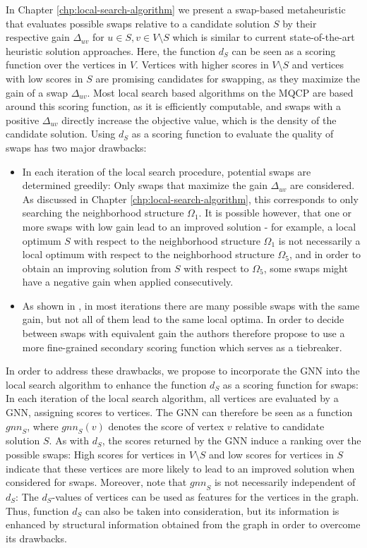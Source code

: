 \documentclass[draft,final]{vutinfth} %
\begin{document}
In Chapter \ref{chp:local-search-algorithm} we present a swap-based metaheuristic that evaluates possible swaps relative to a candidate solution $S$ by their respective gain $\Delta_{uv}$ for $u \in S, v \in V \setminus S$ which is similar to current state-of-the-art heuristic solution approaches. 
Here, the function $d_S$ can be seen as a scoring function over the vertices in $V$. Vertices with higher scores in $V \setminus S$ and vertices with low scores in $S$ are promising candidates for swapping, as they maximize the gain of a swap $\Delta_{uv}$. 
Most local search based algorithms on the MQCP are based around this scoring function, as it is efficiently computable, and swaps with a positive $\Delta_{uv}$ directly increase the objective value, which is the density of the candidate solution. 
Using $d_S$ as a scoring function to evaluate the quality of swaps has two major drawbacks:
\begin{itemize}
    \item In each iteration of the local search procedure, potential swaps are determined greedily: Only swaps that maximize the gain $\Delta_{uv}$ are considered. As discussed in Chapter \ref{chp:local-search-algorithm}, this corresponds to only searching the neighborhood structure $\Omega_1$. It is possible however, that one or more swaps with low gain lead to an improved solution - for example, a local optimum $S$ with respect to the neighborhood structure $\Omega_1$ is not necessarily a local optimum with respect to the neighborhood structure $\Omega_5$, and in order to obtain an improving solution from $S$ with respect to $\Omega_5$, some swaps might have a negative gain when applied consecutively. 
    \item As shown in \cite{chen_nuqclq_2021}, in most iterations there are many possible swaps with the same gain, but not all of them lead to the same local optima. In order to decide between swaps with equivalent gain the authors therefore propose to use a more fine-grained secondary scoring function which serves as a tiebreaker. 
\end{itemize}

In order to address these drawbacks, we propose to incorporate the GNN into the local search algorithm to enhance the function $d_S$ as a scoring function for swaps: In each iteration of the local search algorithm, all vertices are evaluated by a GNN, assigning scores to vertices. The GNN can therefore be seen as a function $\mathit{gnn}_S$, where $\mathit{gnn}_S(v)$ denotes the score of vertex $v$ relative to candidate solution $S$. 
As with $d_S$, the scores returned by the GNN induce a ranking over the possible swaps: High scores for vertices in $V \setminus S$ and low scores for vertices in $S$ indicate that these vertices are more likely to lead to an improved solution when considered for swaps. 
Moreover, note that $\mathit{gnn}_S$ is not necessarily independent of $d_S$: The $d_S$-values of vertices can be used as features for the vertices in the graph. Thus, function $d_S$ can also be taken into consideration, but its information is enhanced by structural information obtained from the graph in order to overcome its drawbacks. 
\end{document}
